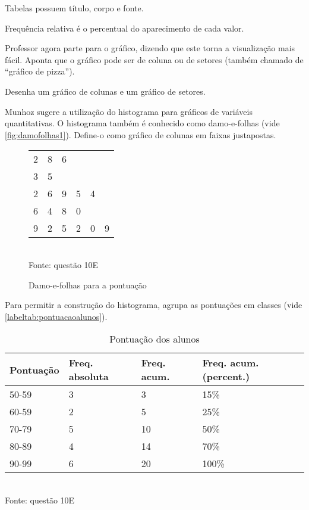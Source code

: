 \documentclass[a4paper]{article}
\begin{document}
	Tabelas possuem título, corpo e fonte.
	
	Frequência relativa é o percentual do aparecimento de cada valor.
	
	Professor agora parte para o gráfico, dizendo que este torna a visualização mais fácil. Aponta que o gráfico pode ser de coluna ou de setores (também chamado de ``gráfico de pizza'').
	
	Desenha um gráfico de colunas e um gráfico de setores.
	
	Munhoz sugere a utilização do histograma para gráficos de variáveis quantitativas. O histograma também é conhecido como damo-e-folhas (vide \autoref{fig:damofolhas1}). Define-o como gráfico de colunas em faixas justapostas.
	
	\begin{figure}[]
		\centering
		\caption{Damo-e-folhas para a pontuação}
		\begin{tabular}{l|lllll}
			2 & 8 & 6 &  &  &  \\
			3 & 5 &  &  &  &  \\
			2 & 6 & 9 & 5 & 4 &  \\
			6 & 4 & 8 & 0 &  &  \\
			9 & 2 & 5 & 2 & 0 & 9
		\end{tabular}
		\\ \vspace{1mm} Fonte: questão 10E
		\label{fig:damofolhas1}
	\end{figure}
	
	Para permitir a construção do histograma, agrupa as pontuações em classes (vide \autoref{labeltab:pontuacaoalunos}).
	
	\begin{table}[]
		\centering
		\caption{Pontuação dos alunos}
		\begin{tabular}{l|l|l|l}
			\textbf{Pontuação} & \textbf{Freq. absoluta} & \textbf{Freq. acum.} & \textbf{Freq. acum. (percent.)} \\ \hline
			50-59 & 3 & 3 & 15\% \\
			60-59 & 2 & 5 & 25\% \\
			70-79 & 5 & 10 & 50\% \\
			80-89 & 4 & 14 & 70\% \\
			90-99 & 6 & 20 & 100\%
		\end{tabular}
		\\ \vspace{1mm} Fonte: questão 10E
		\label{tab:pontuacaoalunos}
	\end{table}
	
\end{document}
